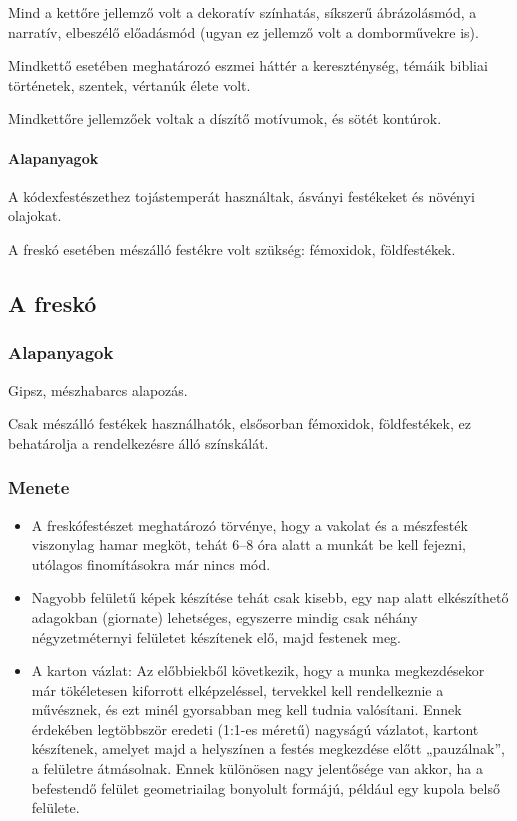 Mind a kettőre jellemző volt a dekoratív színhatás, síkszerű ábrázolásmód, a narratív, elbeszélő előadásmód (ugyan ez jellemző volt a domborművekre is).

Mindkettő esetében meghatározó eszmei háttér a kereszténység, témáik bibliai történetek, szentek, vértanúk élete volt.

Mindkettőre jellemzőek voltak a díszítő motívumok, és sötét kontúrok.

\paragraph{Alapanyagok}

	A kódexfestészethez tojástemperát használtak, ásványi festékeket és növényi olajokat.
	
	A freskó esetében mészálló festékre volt szükség: fémoxidok, földfestékek.

\subsection*{A freskó}

	\subsubsection{Alapanyagok}
	
	Gipsz, mészhabarcs alapozás.
	
	Csak mészálló festékek használhatók, elsősorban fémoxidok, földfestékek, ez behatárolja a rendelkezésre álló színskálát.
	
	\subsubsection{Menete}
	
	\begin{itemize}
		\item A freskófestészet meghatározó törvénye, hogy a vakolat és a mészfesték viszonylag hamar megköt, tehát 6–8 óra alatt a munkát be kell fejezni, utólagos finomításokra már nincs mód.
		
		\item Nagyobb felületű képek készítése tehát csak kisebb, egy nap alatt elkészíthető adagokban (giornate) lehetséges, egyszerre mindig csak néhány négyzetméternyi felületet készítenek elő, majd festenek meg.
		
		\item A karton vázlat: Az előbbiekből következik, hogy a munka megkezdésekor már tökéletesen kiforrott elképzeléssel, tervekkel kell rendelkeznie a művésznek, és ezt minél gyorsabban meg kell tudnia valósítani. Ennek érdekében legtöbbször eredeti (1:1-es méretű) nagyságú vázlatot, kartont készítenek, amelyet majd a helyszínen a festés megkezdése előtt „pauzálnak”, a felületre átmásolnak. Ennek különösen nagy jelentősége van akkor, ha a befestendő felület geometriailag bonyolult formájú, például egy kupola belső felülete.
	\end{itemize}

